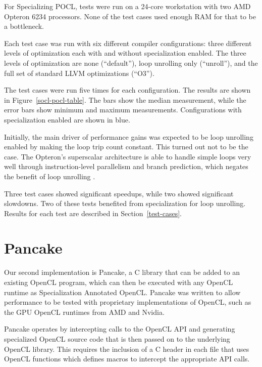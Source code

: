 \documentclass{acm_proc_article-sp}
\begin{document}
For Specializing POCL, tests were run on a 24-core workstation with two AMD
Opteron 6234 processors. None of the test cases used enough RAM for that to be
a bottleneck. 

Each test case was run with six different compiler configurations: three
different levels of optimization each with and without specialization enabled.
The three levels of optimization are none (``default''), loop unrolling only
(``unroll''), and the full set of standard LLVM optimizations (``O3'').

The test cases were run five times for each configuration. The results are
shown in Figure~\ref{socl-pocl-table}. The bars show the median measurement,
while the error bars show minimum and maximum measurements. Configurations with
specialization enabled are shown in blue.

% 

Initially, the main driver of performance gains was expected to be loop
unrolling enabled by making the loop trip count constant. This turned out not
to be the case. The Opteron's superscalar architecture is able to handle simple
loops very well through instruction-level parallelism and branch prediction,
which negates the benefit of loop unrolling \cite{Jouppi:1989:ILP}.

Three test cases showed significant speedups, while two showed significant
slowdowns. Two of these tests benefited from specialization for loop unrolling.
Results for each test are described in Section~\ref{test-cases}.



\section{Pancake}
\label{pancake-spec}

Our second implementation is Pancake, a C library that can be added to an
existing OpenCL program, which can then be executed with any OpenCL runtime as
Specialization Annotated OpenCL. Pancake was written to allow performance to be
tested with proprietary implementations of OpenCL, such as the GPU OpenCL
runtimes from AMD and Nvidia.

Pancake operates by intercepting calls to the OpenCL API and generating
specialized OpenCL source code that is then passed on to the underlying OpenCL
library. This requires the inclusion of a C header in each file that uses
OpenCL functions which defines macros to intercept the appropriate API calls.
\end{document}
